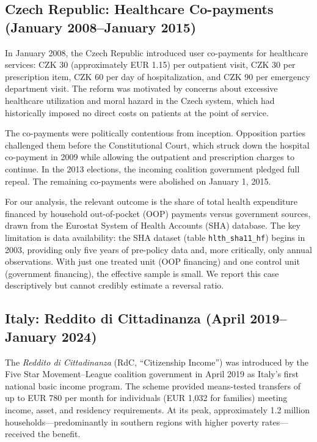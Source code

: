\documentclass[12pt]{article}
\begin{document}
\subsection{Czech Republic: Healthcare Co-payments (January 2008--January 2015)}

In January 2008, the Czech Republic introduced user co-payments for healthcare services: CZK 30 (approximately EUR 1.15) per outpatient visit, CZK 30 per prescription item, CZK 60 per day of hospitalization, and CZK 90 per emergency department visit. The reform was motivated by concerns about excessive healthcare utilization and moral hazard in the Czech system, which had historically imposed no direct costs on patients at the point of service.

The co-payments were politically contentious from inception. Opposition parties challenged them before the Constitutional Court, which struck down the hospital co-payment in 2009 while allowing the outpatient and prescription charges to continue. In the 2013 elections, the incoming coalition government pledged full repeal. The remaining co-payments were abolished on January 1, 2015.

For our analysis, the relevant outcome is the share of total health expenditure financed by household out-of-pocket (OOP) payments versus government sources, drawn from the Eurostat System of Health Accounts (SHA) database. The key limitation is data availability: the SHA dataset (table \texttt{hlth\_sha11\_hf}) begins in 2003, providing only five years of pre-policy data and, more critically, only annual observations. With just one treated unit (OOP financing) and one control unit (government financing), the effective sample is small. We report this case descriptively but cannot credibly estimate a reversal ratio.

\subsection{Italy: Reddito di Cittadinanza (April 2019--January 2024)}

The \textit{Reddito di Cittadinanza} (RdC, ``Citizenship Income'') was introduced by the Five Star Movement--League coalition government in April 2019 as Italy's first national basic income program. The scheme provided means-tested transfers of up to EUR 780 per month for individuals (EUR 1,032 for families) meeting income, asset, and residency requirements. At its peak, approximately 1.2 million households---predominantly in southern regions with higher poverty rates---received the benefit.
\end{document}
